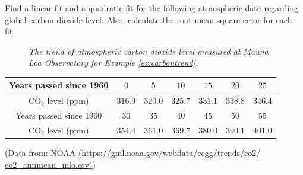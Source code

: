 \begin{Exercise}
\label{ex:carbontrend}
Find a linear fit and a quadratic fit for the following atmospheric data regarding global carbon dioxide level. Also, calculate the root-mean-square error for each fit.
\begin{figure}[h!]
\centering
{}
\caption{\textit{The trend of atmospheric carbon dioxide level measured at Mauna Loa Observatory for Example \ref{ex:carbontrend}.}}
\end{figure}
\begin{center}
\begin{tabular}{|c|c|c|c|c|c|c|}
\hline
Years passed since 1960 & $0$ & $5$ & $10$ & $15$ & $20$ & $25$ \\
\hline
CO$_2$ level (ppm) & $316.9$ & $320.0$ & $325.7$ & $331.1$ & $338.8$ & $346.4$ \\
\hline
Years passed since 1960 & $30$ & $35$ & $40$ & $45$ & $50$ & $55$\\
\hline
CO$_2$ level (ppm) & $354.4$ & $361.0$ & $369.7$ & $380.0$ & $390.1$ & $401.0$\\
\hline
\end{tabular}
\end{center}
(Data from: \href{https://gml.noaa.gov/webdata/ccgg/trends/co2/co2_mm_mlo.csv}{NOAA (https://gml.noaa.gov/webdata/ccgg/trends/co2/\\co2\_annmean\_mlo.csv)})
\end{Exercise}
